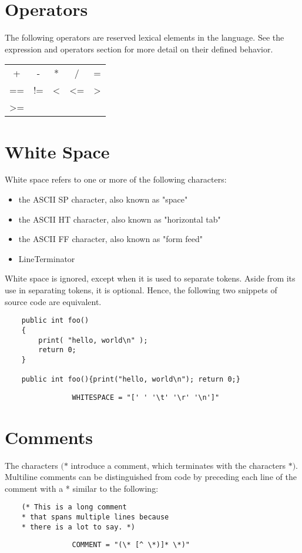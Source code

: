 \begin{homeworkProblem}
	\section{Operators}
	The following operators are reserved lexical elements in the language. See the expression and operators section for more detail on their defined behavior.
	\begin{center}
		\begin{tabular}{ccccc}
			+ & - & * & / & = \\
			== & != & \textless & \textless= & \textgreater \\
			\textgreater= 
		\end{tabular}
	\end{center}
 	
	\section{White Space}
	White space refers to one or more of the following characters:
	\begin{itemize}
		\item the ASCII SP character, also known as "space"
		\item the ASCII HT character, also known as "horizontal tab"
		\item the ASCII FF character, also known as "form feed"
		\item LineTerminator
	\end{itemize}
	White space is ignored, except when it is used to separate tokens. Aside from its use in separating tokens, it is optional. Hence, the following two snippets of source code are equivalent.
	
	\begin{verbatim}
	public int foo()
	{
		print( "hello, world\n" );
		return 0;
	}
	
	public int foo(){print("hello, world\n"); return 0;}
	\end{verbatim}
	
	\begin{verbatim}
				WHITESPACE = "[' ' '\t' '\r' '\n']"
 	\end{verbatim}
	
	\section{Comments}
    The characters $(*$ introduce a comment, which terminates with the characters $*)$.
	Multiline comments can be distinguished from code by preceding each line of the comment with a * similar to the following:
	\begin{verbatim}
	(* This is a long comment 
	* that spans multiple lines because
	* there is a lot to say. *)
	\end{verbatim}

	\begin{verbatim}
				COMMENT = "(\* [^ \*)]* \*)"
	\end{verbatim}

\end{homeworkProblem}
